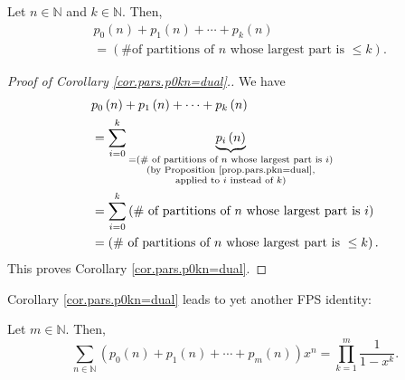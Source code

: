 \begin{corollary}
\label{cor.pars.p0kn=dual}Let $n\in\mathbb{N}$ and $k\in\mathbb{N}$. Then,%
\begin{align*}
&  p_{0}\left(  n\right)  +p_{1}\left(  n\right)  +\cdots+p_{k}\left(
n\right) \\
&  =\left(  \text{\# of partitions of }n\text{ whose largest part is }\leq
k\right)  .
\end{align*}

\end{corollary}

\begin{proof}
[Proof of Corollary \ref{cor.pars.p0kn=dual}.]We have%
\begin{align*}
&  p_{0}\left(  n\right)  +p_{1}\left(  n\right)  +\cdots+p_{k}\left(
n\right) \\
&  =\sum_{i=0}^{k}\underbrace{p_{i}\left(  n\right)  }_{\substack{=\left(
\text{\# of partitions of }n\text{ whose largest part is }i\right)
\\\text{(by Proposition \ref{prop.pars.pkn=dual},}\\\text{applied to }i\text{
instead of }k\text{)}}}\\
&  =\sum_{i=0}^{k}\left(  \text{\# of partitions of }n\text{ whose largest
part is }i\right) \\
&  =\left(  \text{\# of partitions of }n\text{ whose largest part is }\leq
k\right)  .
\end{align*}
This proves Corollary \ref{cor.pars.p0kn=dual}.
\end{proof}

Corollary \ref{cor.pars.p0kn=dual} leads to yet another FPS identity:

\begin{theorem}
\label{thm.pars.main-gf-0n}Let $m\in\mathbb{N}$. Then,%
\[
\sum_{n\in\mathbb{N}}\left(  p_{0}\left(  n\right)  +p_{1}\left(  n\right)
+\cdots+p_{m}\left(  n\right)  \right)  x^{n}=\prod_{k=1}^{m}\dfrac{1}%
{1-x^{k}}.
\]

\end{theorem}

